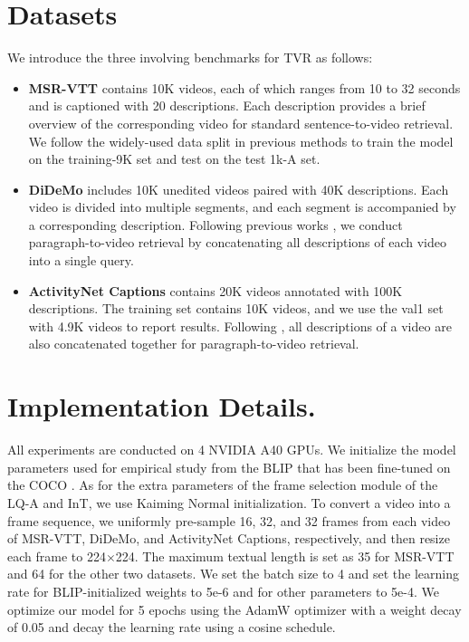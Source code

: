 \documentclass[11pt]{article}
\begin{document}
\section{Datasets}
\label{section:datasets}
We introduce the three involving benchmarks for TVR as follows: 
\begin{itemize}
\item \textbf{MSR-VTT} contains 10K videos, each of which ranges from 10 to 32 seconds and is captioned with 20 descriptions.
Each description provides a brief overview of the corresponding video for standard sentence-to-video retrieval.
We follow the widely-used data split in previous methods \cite{gabeur2020multi, luo2022clip4clip} to train the model on the training-9K set and test on the test 1k-A set.

\item\textbf{DiDeMo} includes 10K unedited videos paired with 40K descriptions. 
Each video is divided into multiple segments, and each segment is accompanied by a corresponding description. 
Following previous works \cite{lei2021less, luo2022clip4clip}, we conduct paragraph-to-video retrieval by concatenating all descriptions of each video into a single query.

\item\textbf{ActivityNet Captions} contains 20K videos annotated with 100K descriptions. 
The training set contains 10K videos, and we use the val1 set with 4.9K videos to report results.
Following \cite{gabeur2020multi, luo2022clip4clip}, all descriptions of a video are also concatenated together for paragraph-to-video retrieval.
\end{itemize}


\section{Implementation Details.}
\label{section:implemention_deatails}

All experiments are conducted on 4 NVIDIA A40 GPUs.
We initialize the model parameters used for empirical study from the BLIP \cite{li2022blip} that has been fine-tuned on the COCO \cite{lin2014microsoft}. 
As for the extra parameters of the frame selection module of the LQ-A and InT, we use Kaiming Normal \cite{he2015delving} initialization.
To convert a video into a frame sequence, we uniformly pre-sample 16, 32, and 32 frames from each video of MSR-VTT, DiDeMo, and ActivityNet Captions, respectively, and then resize each frame to 224$\times$224.
The maximum textual length is set as 35 for MSR-VTT and 64 for the other two datasets.
We set the batch size to 4 and set the learning rate for BLIP-initialized weights to 5e-6 and for other parameters to 5e-4.
We optimize our model for 5 epochs using the AdamW optimizer \cite{loshchilov2017decoupled} with a weight decay of 0.05 and decay the learning rate using a cosine schedule.
\end{document}

